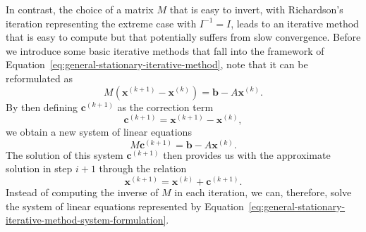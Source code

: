In contrast, the choice of a matrix $M$ that is easy to invert, with Richardson's iteration representing the extreme case with $I^{-1} = I$, leads to an iterative method that is easy to compute but that potentially suffers from slow convergence.
Before we introduce some basic iterative methods that fall into the framework of Equation~\eqref{eq:general-stationary-iterative-method}, note that it can be reformulated as
\begin{equation}
	M (\bm{x}^{(k+1)} - \bm{x}^{(k)}) = \bm{b} - A \bm{x}^{(k)}. 
\end{equation}
By then defining $\bm{c}^{(k+1)}$ as the correction term
\begin{equation}
	\bm{c}^{(k+1)} = \bm{x}^{(k+1)} - \bm{x}^{(k)},
\end{equation}
we obtain a new system of linear equations
\begin{equation}
	M \bm{c}^{(k+1)} = \bm{b} - A \bm{x}^{(k)}. 
	\label{eq:general-stationary-iterative-method-system-formulation}
\end{equation}
The solution of this system $\bm{c}^{(k+1)}$ then provides us with the approximate solution in step $i+1$ through the relation
\begin{equation}
	\bm{x}^{(k+1)} =  \bm{x}^{(k)} + \bm{c}^{(k+1)}.
\end{equation}
Instead of computing the inverse of $M$ in each iteration, we can, therefore, solve the system of linear equations represented by Equation~\eqref{eq:general-stationary-iterative-method-system-formulation}.

